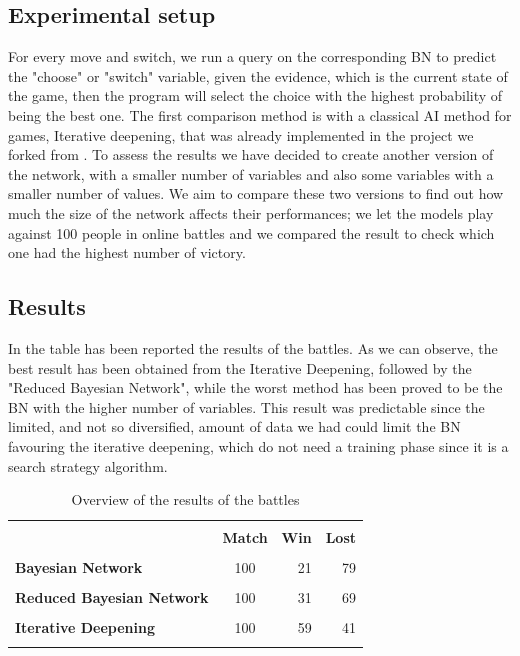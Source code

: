 \documentclass[letterpaper]{article}
\begin{document}
\subsection{Experimental setup}
For every move and switch, we run a query on the corresponding BN to predict the "choose" or "switch" variable, given the evidence, which is the current state of the game, then the program will select the choice with the highest probability of being the best one.
The first comparison method is with a classical AI method for games, Iterative deepening, that was already implemented in the project we forked from \cite{bot}.
To assess the results we have decided to create another version of the network, with a smaller number of variables and also some variables with a smaller number of values. We aim to compare these two versions to find out how much the size of the network affects their performances; we let the models play against 100 people in online battles and we compared the result to check which one had the highest number of victory.

\subsection{Results}
In the table has been reported the results of the battles. As we can observe, the best result has been obtained from the Iterative Deepening, followed by the "Reduced Bayesian Network", while the worst method has been proved to be the BN with the higher number of variables. This result was predictable since the limited, and not so diversified, amount of data we had could limit the BN favouring the iterative deepening, which do not need a training phase since it is a search strategy algorithm.
\begin{table}[h]
    \small
    \centering
    \begin{tabular}{lcrr}
        \hline \\[-1.8ex] 
        \hline \\[-1.8ex] 
        \textbf{} & \textbf{Match}  & \textbf{Win} & \textbf{Lost}\\
        \hline \\[-1.8ex] 
        \textbf{Bayesian Network}           &100   &21  &79\\
        \hline \\[-1.8ex] 
        \textbf{Reduced Bayesian Network}   &100  &31  &69\\
        \hline \\[-1.8ex] 
        \textbf{Iterative Deepening}        &100  &59  &41\\
        \hline \\[-1.8ex] 
        
    \end{tabular}
    \caption{Overview of the results of the battles} 
    \label{tab:libraries}
\end{table}
\end{document}
